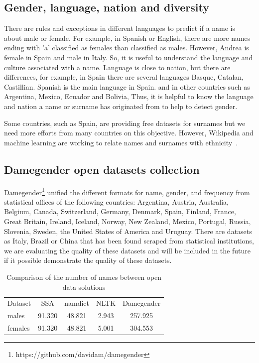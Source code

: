\documentclass[a4paper]{article}
\begin{document}
\subsection{Gender, language, nation and diversity}
\label{sec:diversity}

There are rules and exceptions in different languages to predict if
a name is about male or female. For example, in Spanish or English,
there are more names ending with 'a' classified as females than
classified as males. However, Andrea is female in Spain and
male in Italy. So, it is useful to understand the language and culture
associated with a name. Language is close to nation, but there are
differences, for example, in Spain there are several languages Basque,
Catalan, Castillian. Spanish is the main language in Spain.
and in other countries such as Argentina, Mexico, Ecuador and Bolivia,
Thus, it is helpful to know the language and nation a name or surname
has originated from to help to detect gender.

Some countries, such as Spain, are providing free datasets for
surnames but we need more efforts from many countries on this
objective. However, Wikipedia and machine learning are working
to relate names and surnames with ethnicity~\cite{ambekar2009name}.

\subsection{Damegender open datasets collection}
\label{sec:damegender}

Damegender\footnote{https://github.com/davidam/damegender}
unified the different formats for name, gender,
and frequency from statistical offices of the following countries:
Argentina, Austria, Australia, Belgium, Canada, Switzerland, Germany,
Denmark, Spain, Finland, France, Great Britain, Ireland, Iceland,
Norway, New Zealand, Mexico, Portugal, Russia, Slovenia, Sweden,
the United States of America and Uruguay. There are datasets as Italy,
Brazil or China that has been found scraped from statistical institutions,
we are evaluating the quality of these datasets and will be included
in the future if it possible demonstrate the quality of these datasets.

\begin{table}[t]
\footnotesize
\begin{tabular}[]{lcccc}
  \hline
  Dataset & SSA & namdict & NLTK & Damegender \tabularnewline
  males & 91.320 & 48.821 & 2.943 & 257.925 \tabularnewline
  females & 91.320 & 48.821 & 5.001 & 304.553 \tabularnewline
  \hline
\end{tabular}
\caption{Comparison of the number of names between open data solutions}
\label{table:DifferentNamesMeasures}
\end{table}
\end{document}
